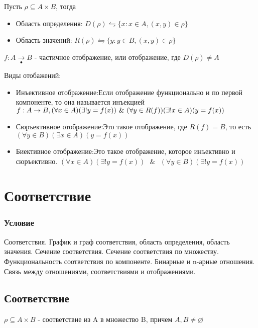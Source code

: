 \documentclass{report}
\newcommand{\band}{\mbox{ } \& \mbox{ }}
\begin{document}
Пусть $\rho \subseteq A \times B$, тогда
\begin{itemize}
    \item Область определения: $D(\rho) \leftrightharpoons \{x:x \in A, (x,y) \in \rho\}$
    \item Область значений: $R(\rho) \leftrightharpoons \{y:y \in B, (x,y) \in \rho\}$
\end{itemize}

$f: A \underset{\bullet}{\rightarrow} B$ - частичное отображение, или отображение, где $D(\rho) \neq A$

Виды отобажений:
\begin{itemize}
    \item Инъективное отображение:\newline Если отображение функционально и по первой компоненте, то она называется инъекцией\newline
          $f: A \rightarrow B, (\forall x \in A)(\exists!\space y = f(x)) \band (\forall y \in R(f))(\exists!\space x \in A)(y = f(x))$
    \item Сюръективное отображение:\newline Это такое отображение, где $R(f) = B$, то есть\newline
          $(\forall y \in B)(\exists x \in A)(y = f(x))$
    \item Биективное отображение:\newline Это такое отображение, которое инъективно и сюръективно.\newline
          $(\forall x \in A)(\exists! y = f(x)) \band (\forall y \in B)(\exists! y = f(x))$
\end{itemize}
\newpage

\section{Соответствие}
\subsubsection{Условие}
Соответствия. График и граф соответствия, область определения, область значения.
Сечение соответствия. Сечение соответствия по множеству. Функциональность
соответствия по компоненте. Бинарные и n-арные отношения. Связь между
отношениями, соответствиями и отображениями.

\subsection{Соответствие}
$\rho \subseteq A \times B$ - соответствие из A в множество B, причем $A,B \neq \varnothing$
\end{document}
